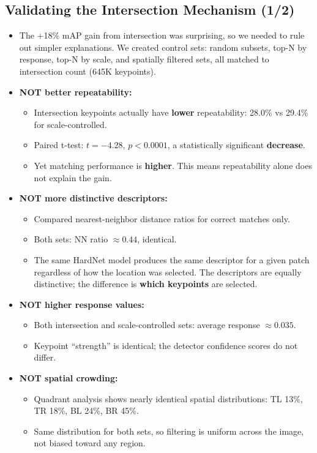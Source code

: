 \documentclass[11pt, letterpaper]{article}
\begin{document}
\subsection{Validating the Intersection Mechanism (1/2)}
\begin{itemize}
  \item The +18\% mAP gain from intersection was surprising, so we needed to rule out simpler explanations. We created control sets: random subsets, top-N by response, top-N by scale, and spatially filtered sets, all matched to intersection count (645K keypoints).
  \item \textbf{NOT better repeatability:}
    \begin{itemize}
      \item Intersection keypoints actually have \textbf{lower} repeatability: 28.0\% vs 29.4\% for scale-controlled.
      \item Paired t-test: $t = -4.28$, $p < 0.0001$, a statistically significant \textbf{decrease}.
      \item Yet matching performance is \textbf{higher}. This means repeatability alone does not explain the gain.
    \end{itemize}
  \item \textbf{NOT more distinctive descriptors:}
    \begin{itemize}
      \item Compared nearest-neighbor distance ratios for correct matches only.
      \item Both sets: NN ratio $\approx 0.44$, identical.
      \item The same HardNet model produces the same descriptor for a given patch regardless of how the location was selected. The descriptors are equally distinctive; the difference is \textbf{which keypoints} are selected.
    \end{itemize}
  \item \textbf{NOT higher response values:}
    \begin{itemize}
      \item Both intersection and scale-controlled sets: average response $\approx 0.035$.
      \item Keypoint ``strength'' is identical; the detector confidence scores do not differ.
    \end{itemize}
  \item \textbf{NOT spatial crowding:}
    \begin{itemize}
      \item Quadrant analysis shows nearly identical spatial distributions: TL 13\%, TR 18\%, BL 24\%, BR 45\%.
      \item Same distribution for both sets, so filtering is uniform across the image, not biased toward any region.
    \end{itemize}
\end{itemize}
\end{document}
